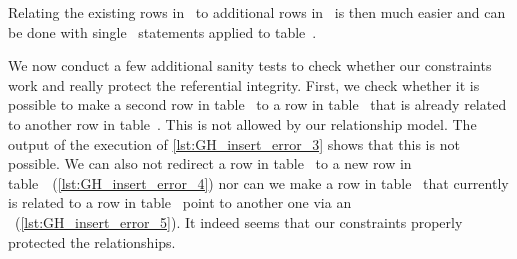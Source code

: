 Relating the existing rows in~ to additional rows in~ is then much easier and can be done with single ~statements applied to table~.

We now conduct a few additional sanity tests to check whether our constraints work and really protect the referential integrity.
First, we check whether it is possible to make a second row in table~ to a row in table~ that is already related to another row in table~.
This is not allowed by our relationship model.
The output of the execution of \cref{lst:GH_insert_error_3} shows that this is not possible.
We can also not redirect a row in table~ to a new row in table~~(\cref{lst:GH_insert_error_4}) nor can we make a row in table~ that currently is related to a row in table~ point to another one via an ~(\cref{lst:GH_insert_error_5}).
It indeed seems that our constraints properly protected the relationships.%
\FloatBarrier%
\endhsection%
%
